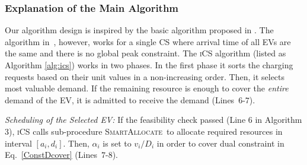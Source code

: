 \documentclass[journal]{IEEEtran}
\newcommand{\revv}[1]{{\color{black}#1}}%
\newcommand{\sa}{\textsc{SmartAllocate}}
\newcommand{\ics}{\textsc{iCS}\xspace}
\begin{document}
		
		
		\subsubsection{Explanation of the Main Algorithm} 
		\label{sec:icsexplanation}
		Our algorithm design is inspired by the basic algorithm proposed in \cite{Jain}. \revv{The algorithm in~\cite{Jain}, however, works for a single CS where arrival time of all EVs are the same and there is no global peak constraint.}
		The \ics algorithm (listed as Algorithm \ref{alg:ics}) works in two phases. In the first phase it sorts the charging requests based on their unit values in a non-increasing order. Then, it selects most valuable demand. If the remaining resource is enough to cover the \emph{entire} demand of the EV, it is admitted to receive the demand (Lines~$6$-$7$). 
		
		\emph{Scheduling of the Selected EV:} \revv{If the feasibility check passed (Line 6 in Algorithm 3)}, \ics calls sub-procedure \sa\ to allocate required resources in interval $[a_i,d_i]$. Then, $\alpha _i$ is set to $v_i\slash D_i$ in order to cover dual constraint in Eq.~\eqref{ConstDcover} (Lines~$7$-$8$). 
		
\end{document}
